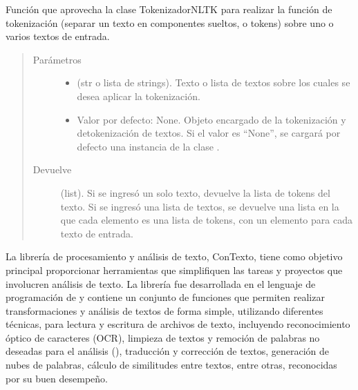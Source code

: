 \documentclass[letterpaper,10pt,openany,spanish]{sphinxmanual}
\begin{document}
\begin{fulllineitems}
\label{\detokenize{funciones/utils:utils.tokenizacion.tokenizar}}
Función que aprovecha la clase TokenizadorNLTK para realizar la función de tokenización         (separar un texto en componentes sueltos, o tokens) sobre uno o varios textos de entrada.
\begin{quote}\begin{description}
\item[{Parámetros}] \leavevmode\begin{itemize}
\item {} 
 \textendash{} (str o lista de strings). Texto o lista de textos sobre los cuales se desea         aplicar la tokenización.

\item {} 
 \textendash{} Valor por defecto: None. Objeto encargado de la tokenización y detokenización         de textos. Si el valor es “None”, se cargará por defecto una instancia de la clase .

\end{itemize}

\item[{Devuelve}] \leavevmode
(list). Si se ingresó un solo texto, devuelve la lista de tokens del texto. Si se         ingresó una lista de textos, se devuelve una lista en la que cada elemento es una lista de         tokens, con un elemento para cada texto de entrada.

\end{description}\end{quote}

\end{fulllineitems}


\begin{figure}[htbp]
\centering

\noindent{}
\end{figure}

La librería de procesamiento y análisis de texto, ConTexto, tiene como objetivo principal proporcionar herramientas que simplifiquen las tareas y proyectos que involucren análisis de texto. La librería fue desarrollada en el lenguaje de programación de  y contiene un conjunto de funciones que permiten realizar transformaciones y análisis de textos de forma simple, utilizando diferentes técnicas, para lectura y escritura de archivos de texto, incluyendo reconocimiento óptico de caracteres (OCR), limpieza de textos y remoción de palabras no deseadas para el análisis (), traducción y corrección de textos, generación de nubes de palabras, cálculo de similitudes entre textos, entre otras, reconocidas por su buen desempeño.
\end{document}
